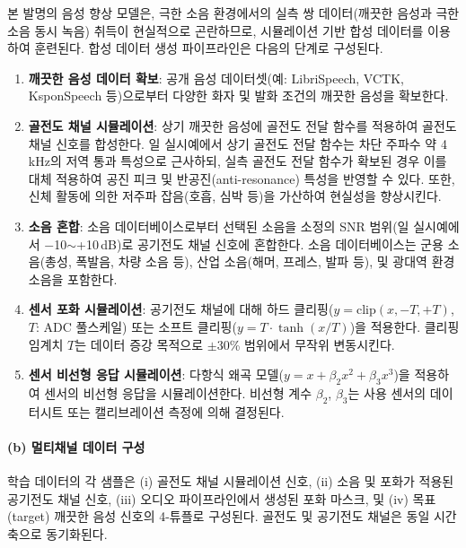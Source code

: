 \documentclass{article}
\begin{document}
본 발명의 음성 향상 모델은, 극한 소음 환경에서의 실측 쌍 데이터(깨끗한 음성과 극한 소음 동시 녹음) 취득이 현실적으로 곤란하므로, 시뮬레이션 기반 합성 데이터를 이용하여 훈련된다. 합성 데이터 생성 파이프라인은 다음의 단계로 구성된다.

\begin{enumerate}
    \item \textbf{깨끗한 음성 데이터 확보}: 공개 음성 데이터셋(예: LibriSpeech, VCTK, KsponSpeech 등)으로부터 다양한 화자 및 발화 조건의 깨끗한 음성을 확보한다.
    
    \item \textbf{골전도 채널 시뮬레이션}: 상기 깨끗한 음성에 골전도 전달 함수를 적용하여 골전도 채널 신호를 합성한다. 일 실시예에서 상기 골전도 전달 함수는 차단 주파수 약 4\,kHz의 저역 통과 특성으로 근사하되, 실측 골전도 전달 함수가 확보된 경우 이를 대체 적용하여 공진 피크 및 반공진(anti-resonance) 특성을 반영할 수 있다. 또한, 신체 활동에 의한 저주파 잡음(호흡, 심박 등)을 가산하여 현실성을 향상시킨다.
    
    \item \textbf{소음 혼합}: 소음 데이터베이스로부터 선택된 소음을 소정의 SNR 범위(일 실시예에서 $-$10$\sim$+10\,dB)로 공기전도 채널 신호에 혼합한다. 소음 데이터베이스는 군용 소음(총성, 폭발음, 차량 소음 등), 산업 소음(해머, 프레스, 발파 등), 및 광대역 환경 소음을 포함한다.
    
    \item \textbf{센서 포화 시뮬레이션}: 공기전도 채널에 대해 하드 클리핑($y = \mathrm{clip}(x, -T, +T)$, $T$: ADC 풀스케일) 또는 소프트 클리핑($y = T \cdot \tanh(x/T)$)을 적용한다. 클리핑 임계치 $T$는 데이터 증강 목적으로 $\pm$30\% 범위에서 무작위 변동시킨다.
    
    \item \textbf{센서 비선형 응답 시뮬레이션}: 다항식 왜곡 모델($y = x + \beta_2 x^2 + \beta_3 x^3$)을 적용하여 센서의 비선형 응답을 시뮬레이션한다. 비선형 계수 $\beta_2$, $\beta_3$는 사용 센서의 데이터시트 또는 캘리브레이션 측정에 의해 결정된다.
\end{enumerate}

\paragraph{(b) 멀티채널 데이터 구성}

학습 데이터의 각 샘플은 (i) 골전도 채널 시뮬레이션 신호, (ii) 소음 및 포화가 적용된 공기전도 채널 신호, (iii) 오디오 파이프라인에서 생성된 포화 마스크, 및 (iv) 목표(target) 깨끗한 음성 신호의 4-튜플로 구성된다. 골전도 및 공기전도 채널은 동일 시간축으로 동기화된다.
\end{document}

